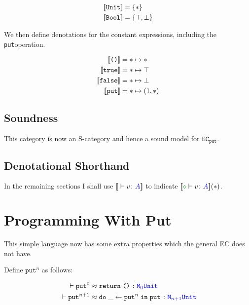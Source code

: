 \documentclass{Report}
\newcommand{\zberelation}[3]{\berelation{}{#1}{#2}{#3}}
\newcommand\ztyperelation[2]{\typerelation{}{#1}{#2}}
\renewcommand\put[0]{\texttt{put}}
\newcommand\ecput[0]{\texttt{EC}_\put}
\begin{document}
\begin{align}
    \label{AdequacyGroundTypeDenotations}
    {\bf [\![}\texttt{Unit}{\bf ]\!]} & = \{\ast\}\\
    {\bf [\![}\texttt{Bool}{\bf ]\!]} & = \{\top, \bot\}
\end{align}

We then define denotations for the constant expressions, including the \put operation. 

\begin{align}
    \label{AdequacyGroundTermDenotations}
    \deno{\u} & = \singleton\mapsto \singleton\\
    \deno{\t} & = \singleton\mapsto \top\\
    \deno{\f} & = \singleton\mapsto \bot\\
    \deno{\put} & = \singleton\mapsto (1, \singleton)\\
\end{align}



\subsection{Soundness}
This category is now an S-category and hence a sound model for $\ecput$.

\subsection{Denotational Shorthand}

In the remaining sections I shall use $\deno{\ztyperelation{v}{A}}$ to indicate $\deno{\typerelation{\nil}{v}{A}}(\singleton)$.

\section{Programming With Put}

This simple language now has some extra properties which the general EC does not have.

\begin{definition}
Define $\put^n$ as follows:

\begin{align}
    \label{PutnDefinition}
    \zberelation{\put^0}{&{\s}\return{\u}}{\M{0}{\U}}\\ 
    \zberelation{\put^{n+1}}{&{\s}\doin{\_}{\put^n}{\put}}{\M{n+1}{\U}}
\end{align}
\end{definition}
\end{document}
